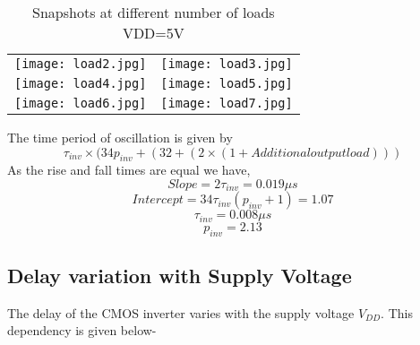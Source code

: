\documentclass[12pt]{article}
\begin{document}
\begin{table}
\centering  %
\begin{tabular}{|c | c|} 
\texttt{[image: load2.jpg]}


& 

\texttt{[image: load3.jpg]}
\\
\texttt{[image: load4.jpg]}


& 

\texttt{[image: load5.jpg]}
\\
\texttt{[image: load6.jpg]}

&

\texttt{[image: load7.jpg]}
\end{tabular}
\caption{Snapshots at different number of loads VDD=5V}
\end{table}

The time period of oscillation is given by
\begin{equation}
    \tau_{inv}\times(34p_{inv}+(32+(2\times(1+Additionaloutputload)))
\end{equation}
As the rise and fall times are equal we have,\\
\begin{equation}
 Slope = 2\tau_{inv} = 0.019 \mu s
\end{equation}
\begin{equation}
 Intercept= 34\tau_{inv}(p_{inv} +1) = 1.07
\end{equation}
 \begin{equation}
 \tau_{inv}= 0.008 \mu s
 \end{equation}
 \begin{equation}
  p_{inv}= 2.13  
 \end{equation}
 \subsection{Delay variation with Supply Voltage}
The delay of the CMOS inverter varies with the supply voltage $V_{DD}$. This dependency is given below-
\end{document}
